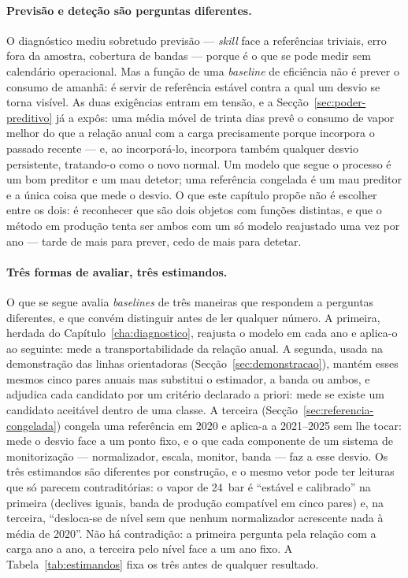\paragraph{Previsão e deteção são perguntas diferentes.} O diagnóstico mediu
sobretudo previsão --- \emph{skill} face a referências triviais, erro fora
da amostra, cobertura de bandas --- porque é o que se pode medir sem
calendário operacional. Mas a função de uma \emph{baseline} de eficiência
não é prever o consumo de amanhã: é servir de referência estável contra a
qual um desvio se torna visível. As duas exigências entram em tensão, e a
Secção~\ref{sec:poder-preditivo} já a expôs: uma média móvel de trinta dias
prevê o consumo de vapor melhor do que a relação anual com a carga
precisamente porque incorpora o passado recente --- e, ao incorporá-lo,
incorpora também qualquer desvio persistente, tratando-o como o novo
normal. Um modelo que segue o processo é um bom preditor e um mau detetor;
uma referência congelada é um mau preditor e a única coisa que mede o
desvio. O que este capítulo propõe não é escolher entre os dois: é
reconhecer que são dois objetos com funções distintas, e que o método em
produção tenta ser ambos com um só modelo reajustado uma vez por ano ---
tarde de mais para prever, cedo de mais para detetar.

\paragraph{Três formas de avaliar, três estimandos.} O que se segue avalia
\emph{baselines} de três maneiras que respondem a perguntas diferentes, e
que convém distinguir antes de ler qualquer número. A primeira, herdada do
Capítulo~\ref{cha:diagnostico}, reajusta o modelo em cada ano e aplica-o ao
seguinte: mede a transportabilidade da relação anual. A segunda, usada na
demonstração das linhas orientadoras (Secção~\ref{sec:demonstracao}),
mantém esses mesmos cinco pares anuais mas substitui o estimador, a banda ou
ambos, e adjudica cada candidato por um critério declarado a priori: mede se
existe um candidato aceitável dentro de uma classe. A terceira
(Secção~\ref{sec:referencia-congelada}) congela uma referência em 2020 e
aplica-a a 2021--2025 sem lhe tocar: mede o desvio face a um ponto fixo, e o
que cada componente de um sistema de monitorização --- normalizador,
escala, monitor, banda --- faz a esse desvio. Os três estimandos são
diferentes por construção, e o mesmo vetor pode ter leituras que só parecem
contraditórias: o vapor de 24~bar é ``estável e calibrado'' na primeira
(declives iguais, banda de produção compatível em cinco pares) e, na
terceira, ``desloca-se de nível sem que nenhum normalizador acrescente nada
à média de 2020''. Não há contradição: a primeira pergunta pela relação com
a carga ano a ano, a terceira pelo nível face a um ano fixo. A
Tabela~\ref{tab:estimandos} fixa os três antes de qualquer resultado.


